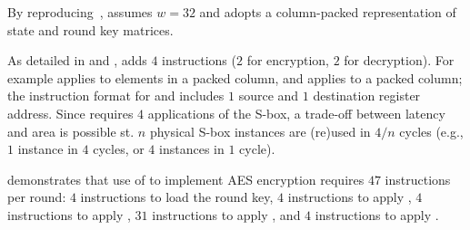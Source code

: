 
By reproducing~\cite[Section 4.2]{TilGro:06},
assumes 
$w = 32$
and adopts a 
column-packed 
representation of state and round key matrices.

As detailed in
and
,
adds
$ 4$
instructions ($2$ for encryption, $2$ for decryption).
For example
applies 
to elements in   a packed column,
and
applies 
to               a packed column;
the instruction format for
and
includes $1$ source and $1$ destination register address.
Since 
requires $4$ applications of the S-box, a trade-off between latency and
area is possible st. 
$n$ physical S-box instances are (re)used in $4/n$ cycles
(e.g., $1$ instance in $4$ cycles, or $4$ instances in $1$ cycle).

demonstrates that use of  to implement AES encryption requires
$47$ instructions per round:
$ 4$            
     instructions to load the round key,
$ 4$            
     instructions to apply ,
$ 4$   
     instructions to apply ,
$31$ instructions to apply ,
and
$ 4$   
     instructions to apply .

